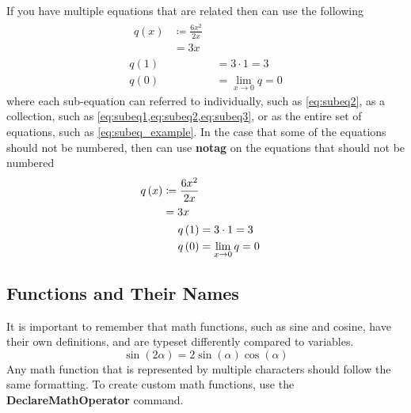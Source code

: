     If you have multiple equations that are related then can use the following
    \begin{subequations} \label{eq:subeq_example}
        \begin{align}
            \begin{split}
                q\left(x\right)&\coloneq\frac{6x^2}{2x} \\
                &=3x
            \end{split} \label{eq:subeq1} \\
            q\left(1\right)
                &=3\cdot 1=3 \label{eq:subeq2} \\
            q\left(0\right)
                &=\lim_{x\to 0} q=0 \label{eq:subeq3}
        \end{align}
    \end{subequations}
    where each sub-equation can referred to individually, such as \cref{eq:subeq2}, as a collection, such as \cref{eq:subeq1,eq:subeq2,eq:subeq3}, or as the entire set of equations, such as \cref{eq:subeq_example}.
    In the case that some of the equations should not be numbered, then can use \textbf{notag} on the equations that should not be numbered
    \begin{subequations}
        \begin{align}
            \begin{split}
                q\left(x\right)
                    &\coloneq\frac{6x^2}{2x} \\
                    &=3x
            \end{split} \\
            q\left(1\right)
                &=3\cdot 1=3 \notag \\
            q\left(0\right)
                &=\lim_{x\to 0} q=0
        \end{align}
    \end{subequations}

\subsection{Functions and Their Names}
    It is important to remember that math functions, such as sine and cosine, have their own definitions, and are typeset differently compared to variables.
    \begin{equation}
        \sin\left(2\alpha\right)=2\sin\left(\alpha\right)\cos\left(\alpha\right)
    \end{equation}
    Any math function that is represented by multiple characters should follow the same formatting.
    To create custom math functions, use the \textbf{DeclareMathOperator} command.

